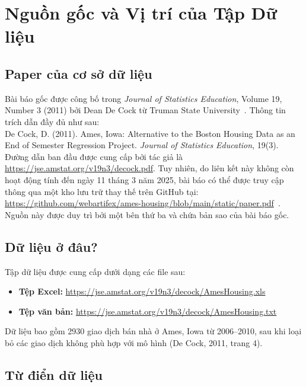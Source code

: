 \documentclass{article}
\begin{document}
\section{Nguồn gốc và Vị trí của Tập Dữ liệu}

\subsection{Paper của cơ sở dữ liệu}
Bài báo gốc được công bố trong \textit{Journal of Statistics Education}, Volume 19, Number 3 (2011) bởi Dean De Cock từ Truman State University~\cite{decock2011}. Thông tin trích dẫn đầy đủ như sau: \\
De Cock, D. (2011). Ames, Iowa: Alternative to the Boston Housing Data as an End of Semester Regression Project. \textit{Journal of Statistics Education}, 19(3). \\
Đường dẫn ban đầu được cung cấp bởi tác giả là \url{https://jse.amstat.org/v19n3/decock.pdf}. Tuy nhiên, do liên kết này không còn hoạt động tính đến ngày 11 tháng 3 năm 2025, bài báo có thể được truy cập thông qua một kho lưu trữ thay thế trên GitHub tại: \url{https://github.com/webartifex/ames-housing/blob/main/static/paper.pdf}~\cite{github2025}. Nguồn này được duy trì bởi một bên thứ ba và chứa bản sao của bài báo gốc.

\subsection{Dữ liệu ở đâu?}

Tập dữ liệu được cung cấp dưới dạng các file sau:

\begin{itemize}[label=$\bullet$]
    \item \textbf{Tệp Excel:} \href{https://jse.amstat.org/v19n3/decock/AmesHousing.xls}{https://jse.amstat.org/v19n3/decock/AmesHousing.xls}
    \item \textbf{Tệp văn bản:} \href{https://jse.amstat.org/v19n3/decock/AmesHousing.txt}{https://jse.amstat.org/v19n3/decock/AmesHousing.txt}
\end{itemize}

Dữ liệu bao gồm 2930 giao dịch bán nhà ở Ames, Iowa từ 2006--2010, sau khi loại bỏ các giao dịch không phù hợp với mô hình (De Cock, 2011, trang 4).

\subsection{Từ điển dữ liệu}
\end{document}
